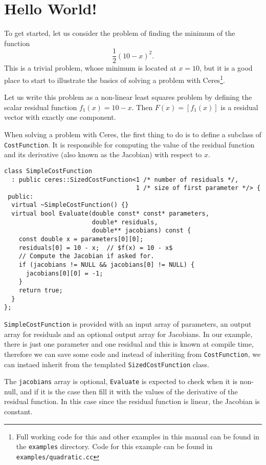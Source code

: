 \chapter{Hello World!}
\label{chapter:tutorial:helloworld}
To get started, let us consider the problem of finding the minimum of the function
\begin{equation}
 \frac{1}{2}(10 -x)^2.
\end{equation}
This is a trivial problem, whose minimum is located at $x = 10$, but it is a good place to start to illustrate the basics of solving a problem with Ceres\footnote{Full working code for this and other examples in this manual can be found in the \texttt{examples} directory. Code for this example can be found in \texttt{examples/quadratic.cc}}. 


Let us write this problem as a non-linear least squares problem by defining the scalar residual function $f_1(x) = 10 - x$. Then $F(x) = [f_1(x)]$ is a residual vector with exactly one component.

When solving a problem with Ceres, the first thing to do is to define a subclass of \texttt{CostFunction}. It is responsible for computing the value of the residual function and its derivative (also known as the Jacobian) with respect to $x$.
\begin{verbatim}
class SimpleCostFunction
  : public ceres::SizedCostFunction<1 /* number of residuals */,
                                    1 /* size of first parameter */> {
 public:
  virtual ~SimpleCostFunction() {}
  virtual bool Evaluate(double const* const* parameters,
                        double* residuals,
                        double** jacobians) const {
    const double x = parameters[0][0];
    residuals[0] = 10 - x;  // $f(x) = 10 - x$
    // Compute the Jacobian if asked for.
    if (jacobians != NULL && jacobians[0] != NULL) {
      jacobians[0][0] = -1;
    }
    return true;
  }
};
\end{verbatim}
\texttt{SimpleCostFunction} is provided with an input array of parameters, an output array for residuals and an optional output array for Jacobians. In our example, there is just one parameter and one residual and this is known at compile time, therefore we can save some code and instead of inheriting from \texttt{CostFunction}, we can instaed inherit from the templated \texttt{SizedCostFunction} class. 


The \texttt{jacobians} array is optional, \texttt{Evaluate} is expected to check when it is non-null, and if it is the case then fill it with the values of the derivative of the residual function. In this case since the residual function is linear, the Jacobian is constant.

